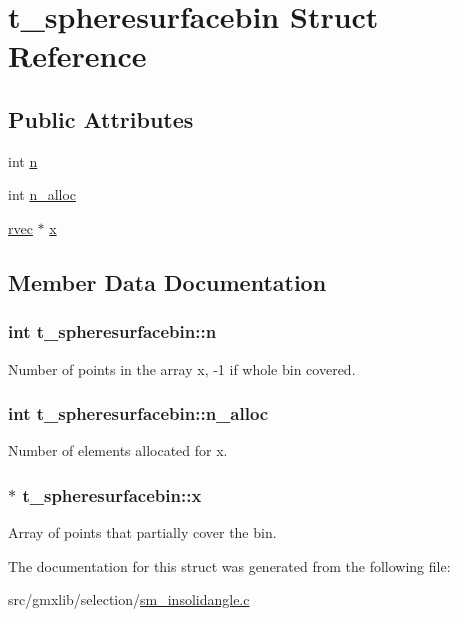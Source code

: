 \hypertarget{structt__spheresurfacebin}{\section{t\-\_\-spheresurfacebin \-Struct \-Reference}
\label{structt__spheresurfacebin}
}
\subsection*{\-Public \-Attributes}
\begin{DoxyCompactItemize}
\item 
int \hyperlink{structt__spheresurfacebin_a7bc5e23b3634606dd4db9628150abe20}{n}
\item 
int \hyperlink{structt__spheresurfacebin_ac07e172ee4b7982cbf9b6a5236fdf6c9}{n\-\_\-alloc}
\item 
\hyperlink{share_2template_2gromacs_2types_2simple_8h_aa02a552a4abd2f180c282a083dc3a999}{rvec} $\ast$ \hyperlink{structt__spheresurfacebin_afe56401575d07d14f997cfa0804e2abd}{x}
\end{DoxyCompactItemize}


\subsection{\-Member \-Data \-Documentation}
\hypertarget{structt__spheresurfacebin_a7bc5e23b3634606dd4db9628150abe20}{
\subsubsection[{n}]{\setlength{\rightskip}{0pt plus 5cm}int {\bf t\-\_\-spheresurfacebin\-::n}}}\label{structt__spheresurfacebin_a7bc5e23b3634606dd4db9628150abe20}
\-Number of points in the array {\ttfamily x}, -\/1 if whole bin covered. \hypertarget{structt__spheresurfacebin_ac07e172ee4b7982cbf9b6a5236fdf6c9}{
\subsubsection[{n\-\_\-alloc}]{\setlength{\rightskip}{0pt plus 5cm}int {\bf t\-\_\-spheresurfacebin\-::n\-\_\-alloc}}}\label{structt__spheresurfacebin_ac07e172ee4b7982cbf9b6a5236fdf6c9}
\-Number of elements allocated for {\ttfamily x}. \hypertarget{structt__spheresurfacebin_afe56401575d07d14f997cfa0804e2abd}{
\subsubsection[{x}]{$\ast$ {\bf t\-\_\-spheresurfacebin\-::x}}}\label{structt__spheresurfacebin_afe56401575d07d14f997cfa0804e2abd}
\-Array of points that partially cover the bin. 

\-The documentation for this struct was generated from the following file\-:\begin{DoxyCompactItemize}
\item 
src/gmxlib/selection/\hyperlink{sm__insolidangle_8c}{sm\-\_\-insolidangle.\-c}\end{DoxyCompactItemize}
